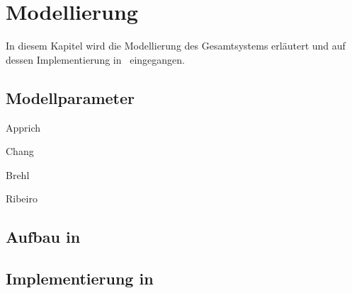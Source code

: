 \chapter{Modellierung}\label{cha:modell}

In diesem Kapitel wird die Modellierung des Gesamtsystems erläutert und auf dessen Implementierung in \Simulink\ eingegangen.





\section{Modellparameter}\label{sec:mparams}

Apprich \cite{apprich}

Chang \cite{chang}

Brehl \cite{brehl}

Ribeiro \cite{ribeiro}


\section{Aufbau in \Simulink}



\section{Implementierung in \Matlab}